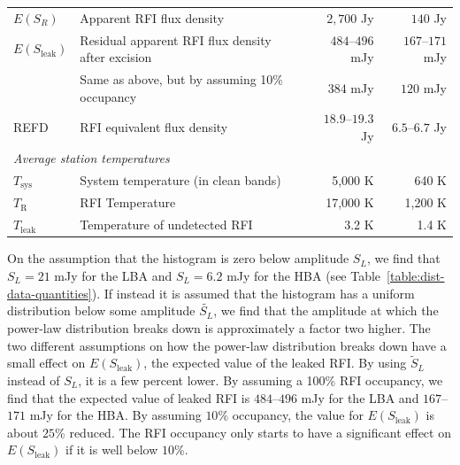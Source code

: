 \documentclass[useAMS,usenatbib]{mn2e}
\begin{document}
\begin{table}
\begin{minipage}{12cm}
\begin{tabular}{@{}llrr@{}}
$E(S_R)$ & Apparent RFI flux density & $2,700$ Jy & $140$ Jy \\
$E(S_\textrm{leak})$& Residual apparent RFI flux density after excision & $484$--$496$ mJy & $167$--$171$ mJy \\
 & Same as above, but by assuming 10\% occupancy & $384$ mJy & $120$ mJy \\ %
REFD& RFI equivalent flux density & $18.9$--$19.3$ Jy & $6.5$--$6.7$ Jy \\
\hline
\multicolumn{4}{l}{\textit{Average station temperatures}} \\
\hline
$T_\textrm{sys}$ & System temperature (in clean bands)  & 5,000 K & 640 K \\
$T_\textrm{R}$ & RFI Temperature & 17,000 K & 1,200 K \\
$T_\textrm{leak}$ & Temperature of undetected RFI & 3.2 K & 1.4 K \\
\hline
\hline
\end{tabular}
\end{minipage}
\end{table}

On the assumption that the histogram is zero below amplitude $S_L$, we find that $S_L=21$ mJy for the LBA and $S_L=6.2$ mJy for the HBA (see Table~\ref{table:dist-data-quantities}). If instead it is assumed that the histogram has a uniform distribution below some amplitude $\tilde{S_L}$, we find that the amplitude at which the power-law distribution breaks down is approximately a factor two higher. The two different assumptions on how the power-law distribution breaks down have a small effect on $E(S_\textrm{leak})$, the expected value of the leaked RFI. By using $\tilde{S}_L$ instead of $S_L$, it is a few percent lower. By assuming a 100\% RFI occupancy, we find that the expected value of leaked RFI is $484$--$496$ mJy for the LBA and $167$--$171$ mJy for the HBA. By assuming $10$\% occupancy, the value for $E(S_\textrm{leak})$ is about $25$\% reduced. The RFI occupancy only starts to have a significant effect on $E(S_\textrm{leak})$ if it is well below $10$\%. 
\end{document}
